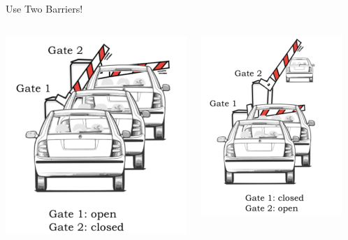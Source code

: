\documentclass[aspectratio=169, 11pt, handout]{beamer}
\begin{document}
\begin{frame}{Use Two Barriers!}
 \begin{columns}
\begin{column}{0.5\textwidth}
\begin{center}
    \includegraphics[width=\textwidth]{ff_cars_1.png}
\end{center}
\end{column} 
\begin{column}{0.5\textwidth}
\begin{center}
    \includegraphics[width=0.9\textwidth]{ff_cars_2.png}

\end{center}
\end{column}
\end{columns}
\end{frame}
\end{document}
